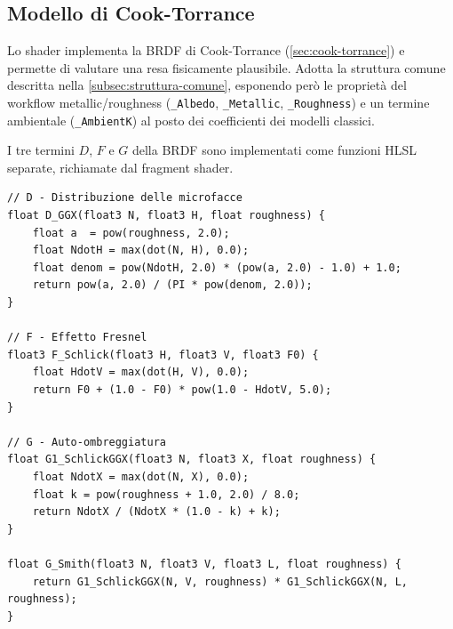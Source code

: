 \documentclass[12pt,a4paper,twoside]{book}
\begin{document}
\begin{minipage}{\textwidth}

\subsection{Modello di Cook-Torrance}
\label{subsec:impl-pbr}

Lo shader implementa la BRDF di Cook-Torrance (\cref{sec:cook-torrance}) e permette di valutare una resa fisicamente plausibile. Adotta la struttura comune descritta nella \cref{subsec:struttura-comune}, esponendo però le proprietà del workflow metallic/roughness (\texttt{\_Albedo}, \texttt{\_Metallic}, \texttt{\_Roughness}) e un termine ambientale (\texttt{\_AmbientK}) al posto dei coefficienti dei modelli classici.

I tre termini $D$, $F$ e $G$ della BRDF sono implementati come funzioni HLSL separate, richiamate dal fragment shader.

\begin{lstlisting}[style=hlsl,
    caption={Funzioni dei termini D, F e G della BRDF.},
    label={lst:pbr-dfg}]
// D - Distribuzione delle microfacce
float D_GGX(float3 N, float3 H, float roughness) {
    float a  = pow(roughness, 2.0);
    float NdotH = max(dot(N, H), 0.0);
    float denom = pow(NdotH, 2.0) * (pow(a, 2.0) - 1.0) + 1.0;
    return pow(a, 2.0) / (PI * pow(denom, 2.0));
}

// F - Effetto Fresnel
float3 F_Schlick(float3 H, float3 V, float3 F0) {
    float HdotV = max(dot(H, V), 0.0);
    return F0 + (1.0 - F0) * pow(1.0 - HdotV, 5.0);
}

// G - Auto-ombreggiatura
float G1_SchlickGGX(float3 N, float3 X, float roughness) {
    float NdotX = max(dot(N, X), 0.0);
    float k = pow(roughness + 1.0, 2.0) / 8.0;
    return NdotX / (NdotX * (1.0 - k) + k);
}

float G_Smith(float3 N, float3 V, float3 L, float roughness) {
    return G1_SchlickGGX(N, V, roughness) * G1_SchlickGGX(N, L, roughness);
}
\end{lstlisting}

\end{minipage}
\end{document}
